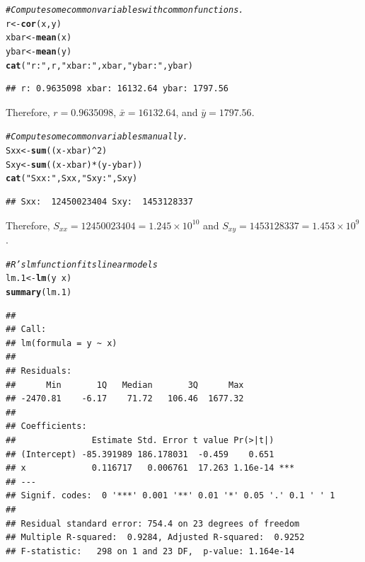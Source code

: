 \documentclass[oneside]{book}\usepackage[]{graphicx}\usepackage[dvipsnames,table,xcdraw]{xcolor}
\makeatletter
\newcommand{\hlnum}[1]{\textcolor[rgb]{0.686,0.059,0.569}{#1}}%
\newcommand{\hlstr}[1]{\textcolor[rgb]{0.192,0.494,0.8}{#1}}%
\newcommand{\hlcom}[1]{\textcolor[rgb]{0.678,0.584,0.686}{\textit{#1}}}%
\newcommand{\hlopt}[1]{\textcolor[rgb]{0,0,0}{#1}}%
\newcommand{\hlstd}[1]{\textcolor[rgb]{0.345,0.345,0.345}{#1}}%
\newcommand{\hlkwb}[1]{\textcolor[rgb]{0.69,0.353,0.396}{#1}}%
\newcommand{\hlkwd}[1]{\textcolor[rgb]{0.737,0.353,0.396}{\textbf{#1}}}%
\newenvironment{kframe}{%
 \def\at@end@of@kframe{}%
 \ifinner\ifhmode%
  \def\at@end@of@kframe{\end{minipage}}%
  \begin{minipage}{\columnwidth}%
 \fi\fi%
 \def\FrameCommand##1{\hskip\@totalleftmargin \hskip-\fboxsep
 \colorbox{shadecolor}{##1}\hskip-\fboxsep
     \hskip-\linewidth \hskip-\@totalleftmargin \hskip\columnwidth}%
 \MakeFramed {\advance\hsize-\width
   \@totalleftmargin\z@ \linewidth\hsize
   \@setminipage}}%
 {\par\unskip\endMakeFramed%
 \at@end@of@kframe}
\newenvironment{knitrout}{}{} %
\makeatother
\begin{document}
\begin{knitrout}
{}


\begin{kframe}\begin{alltt}
\hlcom{# Compute some common variables with common functions.}
\hlstd{r} \hlkwb{<-} \hlkwd{cor}\hlstd{(x, y)}
\hlstd{xbar} \hlkwb{<-} \hlkwd{mean}\hlstd{(x)}
\hlstd{ybar} \hlkwb{<-} \hlkwd{mean}\hlstd{(y)}
\hlkwd{cat}\hlstd{(}\hlstr{"r:"}\hlstd{, r,} \hlstr{"xbar:"}\hlstd{, xbar,} \hlstr{"ybar:"}\hlstd{, ybar)}
\end{alltt}
\begin{verbatim}
## r: 0.9635098 xbar: 16132.64 ybar: 1797.56
\end{verbatim}
\end{kframe}
\end{knitrout}

Therefore, $r=0.9635098$,
$\bar{x}=16132.64$, and $\bar{y}= 1797.56$.

\begin{knitrout}
\color{fgcolor}\begin{kframe}
\begin{alltt}
\hlcom{# Compute some common variables manually.}
\hlstd{Sxx} \hlkwb{<-} \hlkwd{sum}\hlstd{((x} \hlopt{-} \hlstd{xbar)} \hlopt{^} \hlnum{2}\hlstd{)}
\hlstd{Sxy} \hlkwb{<-} \hlkwd{sum}\hlstd{((x} \hlopt{-} \hlstd{xbar)} \hlopt{*} \hlstd{(y} \hlopt{-} \hlstd{ybar))}
\hlkwd{cat}\hlstd{(}\hlstr{"Sxx: "}\hlstd{, Sxx,} \hlstr{"Sxy: "}\hlstd{, Sxy)}
\end{alltt}
\begin{verbatim}
## Sxx:  12450023404 Sxy:  1453128337
\end{verbatim}
\end{kframe}
\end{knitrout}

Therefore, $S_{xx}=12450023404=1.245\times10^{10}$ and
$S_{xy}=1453128337=1.453\times 10^{9}$.

\begin{knitrout}
\color{fgcolor}\begin{kframe}
\begin{alltt}
\hlcom{# R's lm function fits linear models}
\hlstd{lm.1} \hlkwb{<-} \hlkwd{lm}\hlstd{(y} \hlopt{~} \hlstd{x)}
\hlkwd{summary}\hlstd{(lm.1)}
\end{alltt}
\begin{verbatim}
## 
## Call:
## lm(formula = y ~ x)
## 
## Residuals:
##      Min       1Q   Median       3Q      Max 
## -2470.81    -6.17    71.72   106.46  1677.32 
## 
## Coefficients:
##               Estimate Std. Error t value Pr(>|t|)    
## (Intercept) -85.391989 186.178031  -0.459    0.651    
## x             0.116717   0.006761  17.263 1.16e-14 ***
## ---
## Signif. codes:  0 '***' 0.001 '**' 0.01 '*' 0.05 '.' 0.1 ' ' 1
## 
## Residual standard error: 754.4 on 23 degrees of freedom
## Multiple R-squared:  0.9284,	Adjusted R-squared:  0.9252 
## F-statistic:   298 on 1 and 23 DF,  p-value: 1.164e-14
\end{verbatim}
\end{kframe}
\end{knitrout}
\end{document}
